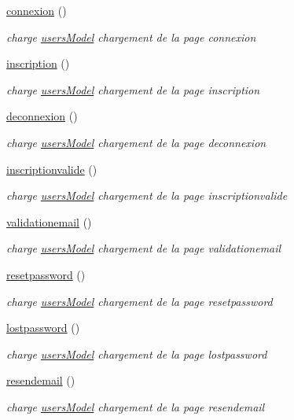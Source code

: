 \begin{DoxyCompactItemize}
\item 
\mbox{\hyperlink{class_users_a9c03f539ceb015f03a9af29db1699504}{connexion}} ()
\begin{DoxyCompactList}\small\item\em charge \mbox{\hyperlink{classusers_model}{users\+Model}} chargement de la page connexion \end{DoxyCompactList}\item 
\mbox{\hyperlink{class_users_a37b13945f573db56d2befc79f7e03ca7}{inscription}} ()
\begin{DoxyCompactList}\small\item\em charge \mbox{\hyperlink{classusers_model}{users\+Model}} chargement de la page inscription \end{DoxyCompactList}\item 
\mbox{\hyperlink{class_users_a9d20501a1404b7175c40417d94e6172a}{deconnexion}} ()
\begin{DoxyCompactList}\small\item\em charge \mbox{\hyperlink{classusers_model}{users\+Model}} chargement de la page deconnexion \end{DoxyCompactList}\item 
\mbox{\hyperlink{class_users_ad6131e845a9e8eadd576c95525110e95}{inscriptionvalide}} ()
\begin{DoxyCompactList}\small\item\em charge \mbox{\hyperlink{classusers_model}{users\+Model}} chargement de la page inscriptionvalide \end{DoxyCompactList}\item 
\mbox{\hyperlink{class_users_a0d97ed6a9ac4b398fa183bdcd9fb819c}{validationemail}} ()
\begin{DoxyCompactList}\small\item\em charge \mbox{\hyperlink{classusers_model}{users\+Model}} chargement de la page validationemail \end{DoxyCompactList}\item 
\mbox{\hyperlink{class_users_acec8594ced3179c05cede5dc3dd29aa6}{resetpassword}} ()
\begin{DoxyCompactList}\small\item\em charge \mbox{\hyperlink{classusers_model}{users\+Model}} chargement de la page resetpassword \end{DoxyCompactList}\item 
\mbox{\hyperlink{class_users_a7358fdfb812ff2972432383f0956485e}{lostpassword}} ()
\begin{DoxyCompactList}\small\item\em charge \mbox{\hyperlink{classusers_model}{users\+Model}} chargement de la page lostpassword \end{DoxyCompactList}\item 
\mbox{\hyperlink{class_users_a4af43a0a0db01d442892d2d2c1b47eb5}{resendemail}} ()
\begin{DoxyCompactList}\small\item\em charge \mbox{\hyperlink{classusers_model}{users\+Model}} chargement de la page resendemail \end{DoxyCompactList}\end{DoxyCompactItemize}
